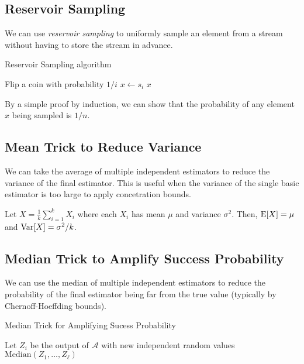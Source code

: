 \documentclass{article}
\begin{document}
\subsection{Reservoir Sampling}

We can use \emph{reservoir sampling} to uniformly sample an element from a stream without having to store the stream in advance.

\begin{algorithm}
  \caption{Reservoir Sampling algorithm}
  \begin{algorithmic}[1]
    \State Flip a coin with probability $1/i$
    \State $x \leftarrow s_i$
    \EndIf
    \EndFor
    \State \Return $x$
    \EndProcedure
  \end{algorithmic}
\end{algorithm}

By a simple proof by induction, we can show that the probability of any element $x$ being sampled is $1/n$.

\subsection{Mean Trick to Reduce Variance}

We can take the average of multiple independent estimators to reduce the variance of the final estimator.
This is useful when the variance of the single basic estimator is too large to apply concetration bounds.

\begin{lemma}
  Let $X = \frac{1}{k} \sum_{i = 1}^{k} X_i$ where each $X_i$ has mean $\mu$ and variance $\sigma^2$.
  Then, $\operatorname{E}[X] = \mu$ and $\operatorname{Var}[X] = \sigma^2 / k$.
\end{lemma}

\subsection{Median Trick to Amplify Success Probability}

We can use the median of multiple independent estimators to reduce the probability of the final estimator being far from the true value (typically by Chernoff-Hoeffding bounds).

\begin{algorithm}
  \caption{Median Trick for Amplifying Sucess Probability}
  \begin{algorithmic}[1]
    \State Let $Z_i$ be the output of $\mathcal{A}$ with new independent random values
    \EndFor
    \State \Return $\text{Median}(Z_1, \ldots, Z_\ell)$
    \EndProcedure
  \end{algorithmic}
\end{algorithm}
\end{document}
